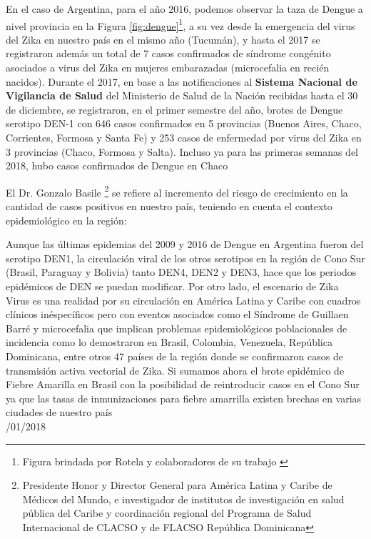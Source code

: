   \par En el caso de Argentina, para el año 2016, podemos observar la taza de
  Dengue a nivel
  provincia \cite{analisis_cordoba} en la
  Figura \ref{fig:dengue}\footnote{Figura brindada por Rotela y
  colaboradores de su trabajo \cite{analisis_cordoba}}, a su vez desde la
  emergencia del virus del Zika en nuestro país en el mismo año (Tucumán),
  y hasta el 2017 se registraron además un total de 7 casos confirmados de
  síndrome congénito asociados a virus del Zika en mujeres embarazadas
  (microcefalia en recién nacidos).
  Durante el 2017, en base a las notificaciones al
  \textbf{Sistema Nacional de Vigilancia de Salud} del Ministerio de Salud de la Nación
  recibidas hasta el 30 de diciembre, se registraron, en el primer semestre del año, brotes de
  Dengue serotipo DEN-1 con 646 casos confirmados en 5 provincias
  (Buenos Aires, Chaco, Corrientes, Formosa y Santa Fe) y 253 casos de enfermedad
  por virus del Zika en 3 provincias (Chaco, Formosa y Salta).
  Incluso ya para las primeras semanas del 2018, hubo casos confirmados
  de Dengue en Chaco



  \par El Dr. Gonzalo Basile \footnote{Presidente Honor y Director General para
                   América Latina y Caribe de Médicos del Mundo, e investigador de institutos de
                   investigación en salud pública del Caribe y coordinación regional del Programa
                   de Salud Internacional de CLACSO y de FLACSO República Dominicana}
       se refiere al incremento del riesgo de crecimiento
       en la cantidad de casos positivos en nuestro país, teniendo en cuenta
       el contexto epidemiológico en la región:
    \begin{framed}

      Aunque las últimas epidemias del 2009 y 2016 de Dengue en Argentina fueron del
      serotipo DEN1, la circulación viral de los otros serotipos en la región de
      Cono Sur (Brasil, Paraguay y Bolivia) tanto DEN4, DEN2 y DEN3, hace que los
      periodos epidémicos de DEN se puedan modificar. Por otro lado, el escenario de
      Zika Virus es una realidad por su circulación en América Latina y Caribe con
      cuadros clínicos inéspecíficos pero con eventos asociados como el Síndrome de
      Guillaen Barré y microcefalia que implican problemas epidemiológicos
      poblacionales de incidencia como lo demostraron en Brasil, Colombia, Venezuela,
      República Dominicana, entre otros 47 países de la región donde se confirmaron
      casos de transmisión activa vectorial de Zika.
      Si sumamos ahora el brote epidémico de Fiebre Amarilla en Brasil con la
      posibilidad de reintroducir casos en el Cono Sur ya que las tasas de
      inmunizaciones para fiebre amarrilla existen brechas en varias ciudades de nuestro país \\

     /01/2018
    \end{framed}



